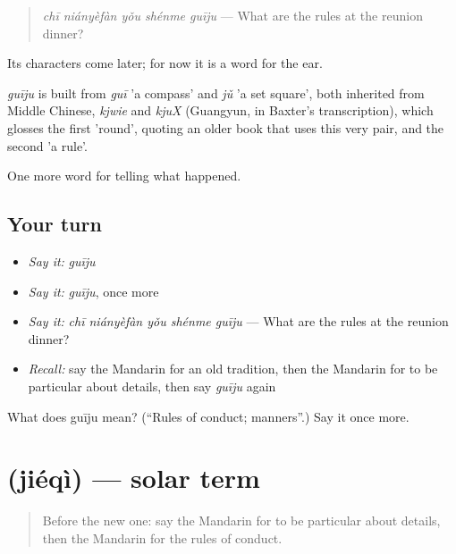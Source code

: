 \begin{quote}
\emph{chī niányèfàn yǒu shénme guīju} — What are the rules at the reunion dinner?
\end{quote}

Its characters come later; for now it is a word for the ear.

\begin{cousinweb}
\emph{guīju} is built from \emph{guī} 'a compass' and \emph{jǔ} 'a set square', both inherited from Middle Chinese, \emph{kjwie} and \emph{kjuX} (Guangyun, in Baxter's transcription), which glosses the first 'round', quoting an older book that uses this very pair, and the second 'a rule'.
\end{cousinweb}

\begin{grammarlens}[title={What you've built}]
One more word for telling what happened.
\end{grammarlens}

\subsection*{Your turn}
\begin{itemize}
\raggedright
  \item \emph{Say it:} \emph{guīju}
  \item \emph{Say it:} \emph{guīju}, once more
  \item \emph{Say it:} \emph{chī niányèfàn yǒu shénme guīju} — What are the rules at the reunion dinner?
  \item \emph{Recall:} say the Mandarin for an old tradition, then the Mandarin for to be particular about details, then say \emph{guīju} again
\end{itemize}

\begin{tcolorbox}[breakable,colback=teal!4,colframe=teal!35!black,title={Before you move on}]
What does guīju mean? (\textquotedblleft{}Rules of conduct; manners\textquotedblright{}.) Say it once more.
\end{tcolorbox}
\section[\texorpdfstring{\zh{节气} (jiéqì)}{节气 (jiéqì)}]{ (jiéqì) — solar term}

\label{lesson:ZH-C340-jieqi}



\begin{quote}
Before the new one: say the Mandarin for to be particular about details, then the Mandarin for the rules of conduct.
\end{quote}

